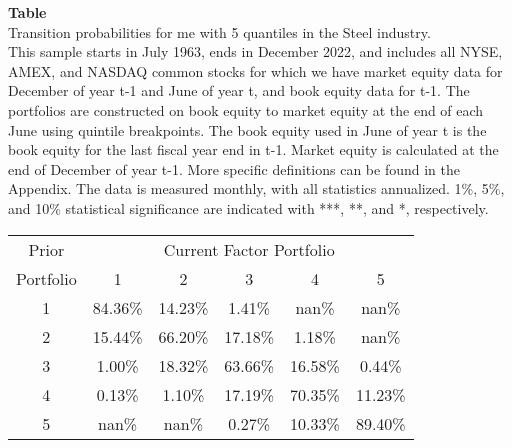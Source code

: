 \begin{table*}[ht!]
\raggedright
{}
\label{tab: transition_probs_me_Steel_with_5_quantiles}
\textbf{Table \thetable} \\
Transition probabilities for me with 5 quantiles in the Steel industry. \\
\hspace*{1em}This sample starts in July 1963, ends in December 2022, and includes all NYSE, AMEX, and NASDAQ common stocks for which we have market equity data for December of year t-1 and June of year t, and book equity data for t-1. The portfolios are constructed on book equity to market equity at the end of each June using quintile breakpoints.  The book equity used in June of year t is the book equity for the last fiscal year end in t-1.  Market equity is calculated at the end of December of year t-1.  More specific definitions can be found in the Appendix.  The data is measured monthly, with all statistics annualized.  1\%, 5\%, and 10\% statistical significance are indicated with ***, **, and *, respectively. \\
\vspace{0.5em}
\centering
\begin{adjustbox}{max width=\textwidth}
\begin{tabular}{@{}cccccc@{}}
\toprule
Prior & \multicolumn{5}{c}{Current Factor Portfolio} \\
Portfolio & 1 & 2 & 3 & 4 & 5 \\
\midrule
1 & 84.36\% & 14.23\% & 1.41\% & nan\% & nan\% \\
2 & 15.44\% & 66.20\% & 17.18\% & 1.18\% & nan\% \\
3 & 1.00\% & 18.32\% & 63.66\% & 16.58\% & 0.44\% \\
4 & 0.13\% & 1.10\% & 17.19\% & 70.35\% & 11.23\% \\
5 & nan\% & nan\% & 0.27\% & 10.33\% & 89.40\% \\
\bottomrule
\end{tabular}
\end{adjustbox}
\end{table*}